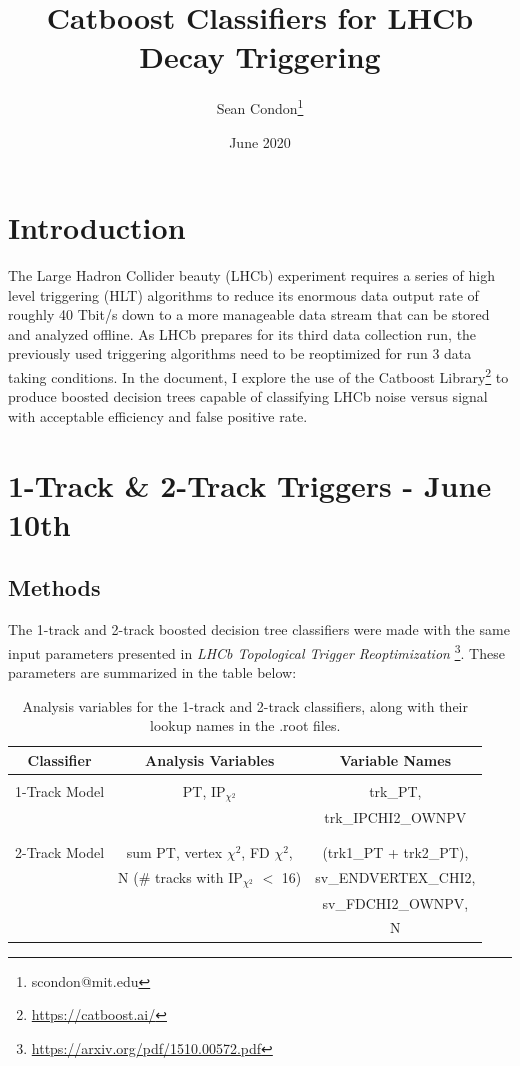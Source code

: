 \documentclass[12pt, letterpaper]{article}
\title{Catboost Classifiers for LHCb Decay Triggering}
\author{Sean Condon\thanks{scondon@mit.edu}}
\date{June 2020}
\begin{document}
\maketitle

\section{Introduction}

The Large Hadron Collider beauty (LHCb) experiment requires a series of high level triggering (HLT) algorithms to reduce its enormous data output rate of roughly 40 Tbit/s down to a more manageable data stream that can be stored and analyzed offline. As LHCb prepares for its third data collection run, the previously used triggering algorithms need to be reoptimized for run 3 data taking conditions. In the document, I explore the use of the Catboost Library\footnote{\url{https://catboost.ai/}} to produce boosted decision trees capable of classifying LHCb noise versus signal with acceptable efficiency and false positive rate. 

\section{1-Track \& 2-Track Triggers - June 10th}

\subsection{Methods}

The 1-track and 2-track boosted decision tree classifiers were made with the same input parameters presented in \textit{LHCb Topological Trigger Reoptimization} \footnote{\url{https://arxiv.org/pdf/1510.00572.pdf}}. These parameters are summarized in the table below:

\begin{center}
\begin{table}
\begin{tabular}{ c|c|c } 

 \textbf{Classifier} & \textbf{Analysis Variables} & \textbf{Variable Names}\\ 
  \hline
  & & \\
 1-Track Model & PT, $\mathrm{IP}_{\chi^2}$ & trk\_PT,\\ 
 & &  trk\_IPCHI2\_OWNPV \\
 & & \\
  \hline
  & & \\
 2-Track Model & sum PT, vertex $\chi^2$, FD $\chi^2$,  & (trk1\_PT + trk2\_PT),   \\ 
 & N (\# tracks with $\mathrm{IP}_{\chi^2}$ $<$ 16) & sv\_ENDVERTEX\_CHI2,\\
 &  & sv\_FDCHI2\_OWNPV,\\
 & & N \\
 \end{tabular}
 \caption{Analysis variables for the 1-track and 2-track classifiers, along with their lookup names in the .root files.}
 \end{table}
\end{center}
\end{document}
